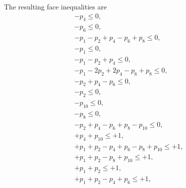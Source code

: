 \documentclass[%
 showpacs,
 showkeys,
 preprintnumbers,
 amsmath,amssymb,
 aps,
  pra,
  longbibliography,
 floatfix,
 ]{revtex4-1}
\begin{document}
The resulting face inequalities are
\begin{eqnarray}
                     - p_4                                                                                 \le     0 , \\
                                   - p_6                                                                   \le     0 , \\
- p_1  - p_2         + p_4         - p_6         + p_8                                                     \le     0 , \\
- p_1                                                                                                      \le     0 , \\
- p_1  - p_2         + p_4                                                                                 \le     0 , \\
- p_1  -2p_2         +2p_4         - p_6         + p_8                                                     \le     0 , \\
       - p_2         + p_4         - p_6                                                                   \le     0 , \\
       - p_2                                                                                               \le     0 , \\
                                                               - p_{10}                                    \le     0 , \\
                                                 - p_8                                                     \le     0 , \\
       - p_2         + p_4         - p_6         + p_8         - p_{10}                                    \le     0 , \\
                     + p_4                                     + p_{10}                                    \le    +1 , \\
+ p_1  + p_2         - p_4         + p_6         - p_8         + p_{10}                                    \le    +1 , \\
+ p_1  + p_2                                     - p_8         + p_{10}                                    \le    +1 , \\
+ p_1  + p_2                                                                                               \le    +1 , \\
+ p_1  + p_2         - p_4         + p_6                                                                   \le    +1 , \\

\end{eqnarray}
\end{document}

